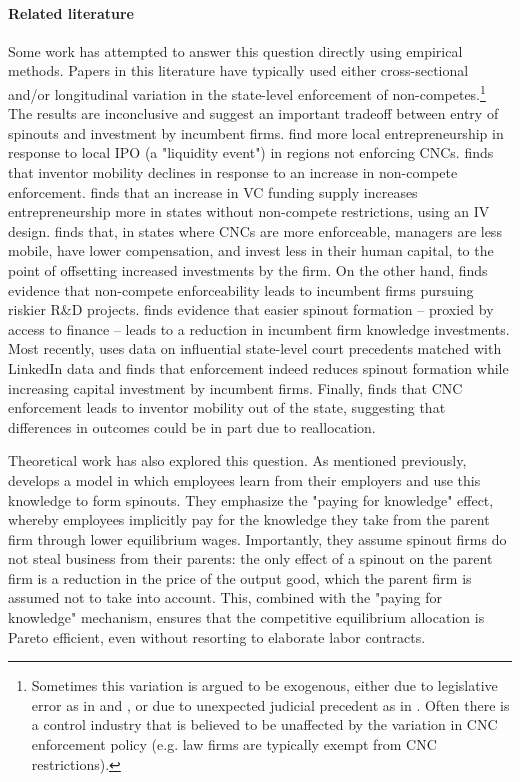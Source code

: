 \documentclass[11pt,english]{article}
\theoremstyle{remark}
\begin{document}
\paragraph{Related literature}

Some work has attempted to answer this question directly using empirical methods. Papers in this literature have typically used either cross-sectional and/or longitudinal variation in the state-level enforcement of non-competes.\footnote{Sometimes this variation is argued to be exogenous, either due to legislative error as in \cite{marx_mobility_2009} and \cite{marx_regional_2015}, or due to unexpected judicial precedent as in \cite{jeffers_impact_2018}. Often there is a control industry that is believed to be unaffected by the variation in CNC enforcement policy (e.g. law firms are typically exempt from CNC restrictions).} The results are inconclusive and suggest an important tradeoff between entry of spinouts and investment by incumbent firms. \cite{stuart_liquidity_2003} find more local  entrepreneurship in response to local IPO (a "liquidity event") in regions not enforcing CNCs. \cite{marx_mobility_2009} finds that inventor mobility declines in response to an increase in non-compete enforcement. \cite{samila_venture_2010} finds that an increase in VC funding supply increases entrepreneurship more in states without non-compete restrictions, using an IV design. \cite{garmaise_ties_2011} finds that, in states where CNCs are more enforceable, managers are less mobile, have lower compensation, and invest less in their human capital, to the point of offsetting increased investments by the firm. On the other hand, \cite{conti_non-competition_2014} finds evidence that non-compete enforceability leads to incumbent firms pursuing riskier R\&D projects. \cite{colombo_does_2013} finds evidence that easier spinout formation -- proxied by access to finance -- leads to a reduction in incumbent firm knowledge investments.  Most recently, \cite{jeffers_impact_2018} uses data on influential state-level court precedents matched with LinkedIn data and finds that enforcement indeed reduces spinout formation while increasing capital investment by incumbent firms. Finally, \cite{marx_regional_2015} finds that CNC enforcement leads to inventor mobility out of the state, suggesting that differences in outcomes could be in part due to reallocation. 

Theoretical work has also explored this question. As mentioned previously, \cite{franco_spin-outs:_2006} develops a model in which employees learn from their employers and use this knowledge to form spinouts. They emphasize the "paying for knowledge" effect, whereby employees implicitly pay for the knowledge they take from the parent firm through lower equilibrium wages. Importantly, they assume spinout firms do not steal business from their parents: the only effect of a spinout on the parent firm is a reduction in the price of the output good, which the parent firm is assumed not to take into account. This, combined with the "paying for knowledge" mechanism, ensures that the competitive equilibrium allocation is Pareto efficient, even without resorting to elaborate labor contracts.
\end{document}
